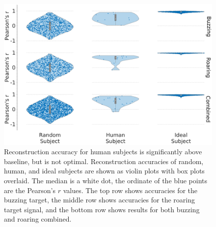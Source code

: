 \documentclass[journal]{IEEEtran}
\begin{document}
\begin{figure}[ht]
    \centering
    \includegraphics[width=\linewidth]{reconstruction_violin_1.eps}
    \caption{Reconstruction accuracy for human subjects is significantly above baseline,
    but is not optimal. Reconstruction accuracies of random, human, and ideal subjects
    are shown as violin plots with box plots overlaid.
    The median is a white dot, the ordinate of the blue points are the Pearson's $r$ values.
    The top row shows accuracies for the buzzing target, the middle row shows accuracies
    for the roaring target signal, and the bottom row shows results for both buzzing and roaring combined.}
    \label{fig:reconstructions}
\end{figure}
\end{document}
